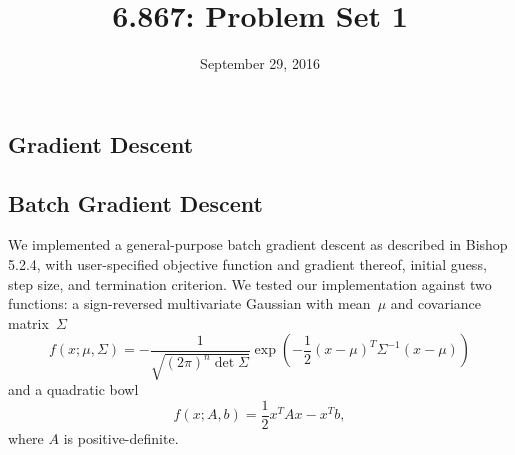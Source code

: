 \documentclass{article}
\title{6.867: Problem Set 1}
\date{September 29, 2016}
\begin{document}

\maketitle

\begin{multicols}{2}

\section{Gradient Descent}

\subsection{Batch Gradient Descent}

We implemented a general-purpose batch gradient descent as described in Bishop 5.2.4, with user-specified objective function and gradient thereof, initial guess, step size, and termination criterion. %
We tested our implementation against two functions: a sign-reversed multivariate Gaussian with mean~$\mu$ and covariance matrix~$\Sigma$
\begin{equation}
f(x; \mu, \Sigma) = -\frac{1}{\sqrt{(2\pi)^n \det\Sigma}}\exp\left( -\frac12(x - \mu)^T \Sigma^{-1}(x - \mu) \right)
\end{equation}
and a quadratic bowl
\begin{equation}
f(x; A, b) = \frac{1}{2}x^T Ax - x^T b,
\end{equation}
where $A$ is positive-definite.




\end{multicols}
\end{document}
